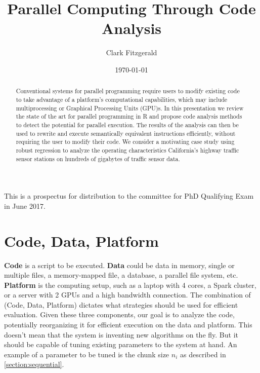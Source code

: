 \documentclass[12pt]{article}
\begin{document}
\title{Parallel Computing Through Code Analysis}
\date{\today}
\author{Clark Fitzgerald}
\maketitle

\begin{abstract}

    Conventional systems for parallel programming require users to modify
    existing code to take advantage of a platform's computational
    capabilities, which may include multiprocessing or Graphical Processing
    Units (GPU)s. In this presentation we review the state of the art for
    parallel programming in R and propose code analysis methods to detect
    the potential for parallel execution. The results of the analysis can
    then be used to rewrite and execute semantically equivalent
    instructions efficiently, without requiring the user to modify their
    code. We consider a motivating case study using robust regression to
    analyze the operating characteristics California's highway traffic
    sensor stations on hundreds of gigabytes of traffic sensor data.

\end{abstract}

This is a prospectus for distribution to the committee for PhD
Qualifying Exam in June 2017.

\section{Code, Data, Platform}

\textbf{Code} is a script to be executed.
\textbf{Data} could be data in memory, single or multiple files, a
memory-mapped file, a database, a parallel file system, etc.
\textbf{Platform} is the computing setup, such as a laptop with 4 cores, a
Spark cluster, or a server with 2 GPUs and a high bandwidth connection. The combination
of (Code, Data, Platform) dictates what strategies should be used for
efficient evaluation. Given these three components, our goal is to analyze the
code, potentially reorganizing it for efficient execution on the data and
platform. This doesn't mean that the system is inventing new algorithms on
the fly. But it should be capable of tuning existing parameters to the
system at hand. An example of a parameter to be tuned is the chunk size
$n_i$ as described in \ref{section:sequential}.
\end{document}
